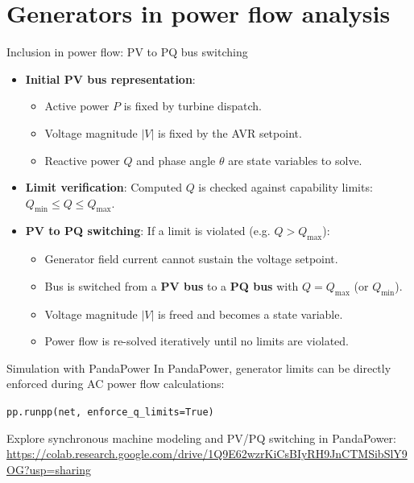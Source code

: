 \section{Generators in power flow analysis}

\begin{frame}{Inclusion in power flow: PV to PQ bus switching}
  \begin{itemize}\setlength{\itemsep}{2pt}\small
    \item \textbf{Initial PV bus representation}:
      \begin{itemize}\setlength{\itemsep}{0pt}
        \item Active power $P$ is fixed by turbine dispatch.
        \item Voltage magnitude $|V|$ is fixed by the AVR setpoint.
        \item Reactive power $Q$ and phase angle $\theta$ are state variables to solve.
      \end{itemize}
    \item \textbf{Limit verification}: Computed $Q$ is checked against capability limits:
      $Q_{\min} \le Q \le Q_{\max}$.
    \item \textbf{PV to PQ switching}: If a limit is violated (e.g. $Q > Q_{\max}$):
      \begin{itemize}\setlength{\itemsep}{0pt}
        \item Generator field current cannot sustain the voltage setpoint.
        \item Bus is switched from a \textbf{PV bus} to a \textbf{PQ bus} with $Q = Q_{\max}$ (or $Q_{\min}$).
        \item Voltage magnitude $|V|$ is freed and becomes a state variable.
        \item Power flow is re-solved iteratively until no limits are violated.
      \end{itemize}
  \end{itemize}
\end{frame}

\begin{frame}{Simulation with PandaPower}
  In PandaPower, generator limits can be directly enforced during AC power flow calculations:
  \vspace{0.3cm}
  \begin{center}
    \texttt{pp.runpp(net, enforce\_q\_limits=True)}
  \end{center}
  \vspace{0.3cm}
  \begin{tcolorbox}[colback=blue!5,colframe=blue!75,title=Google Colab Notebook]
    \centering
    Explore synchronous machine modeling and PV/PQ switching in PandaPower:\\
    \url{https://colab.research.google.com/drive/1Q9E62wzrKiCsBIyRH9JnCTMSibSlY9OG?usp=sharing}
  \end{tcolorbox}
\end{frame}

